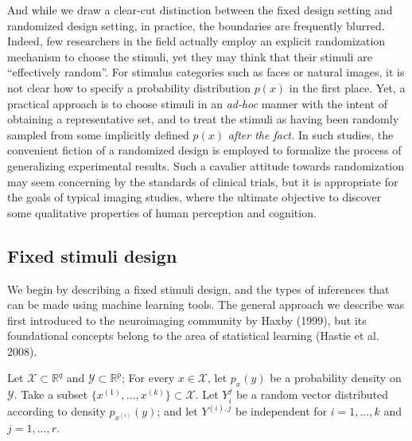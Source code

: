 \documentclass[12pt]{article}
\begin{document}
And while we draw a clear-cut distinction between the fixed design
setting and randomized design setting, in practice, the boundaries are
frequently blurred.  Indeed, few researchers in the field actually
employ an explicit randomization mechanism to choose the stimuli, yet
they may think that their stimuli are ``effectively random''.  For
stimulus categories such as faces or natural images, it is not clear
how to specify a probability distribution $p(x)$ in the first place.
Yet, a practical approach is to choose stimuli in an \emph{ad-hoc}
manner with the intent of obtaining a representative set, and to treat
the stimuli as having been randomly sampled from some implicitly
defined $p(x)$ \emph{after the fact.}  In such studies, the convenient
fiction of a randomized design is employed to formalize the process of
generalizing experimental results.  Such a cavalier attitude towards
randomization may seem concerning by the standards of clinical trials,
but it is appropriate for the goals of typical imaging studies, where
the ultimate objective to discover some qualitative properties of
human perception and cognition.

\subsection{Fixed stimuli design}


We begin by describing a fixed stimuli design, and the types of
inferences that can be made using machine learning tools.  The general
approach we describe was first introduced to the neuroimaging
community by Haxby (1999), but its foundational concepts belong to the
area of statistical learning (Hastie et al. 2008).

Let
$\mathcal{X} \subset \mathbb{R}^q$ and
$\mathcal{Y} \subset \mathbb{R}^p$; 
For every $x \in \mathcal{X}$, let $p_x(y)$
be a probability density on $\mathcal{Y}$.  
Take a subset $\{x^{(1)},\hdots, x^{(k)}\} \subset \mathcal{X}$.  Let
$Y_i^j$ be a random vector distributed according to density
$p_{x^{(i)}}(y)$; and let $Y^{(i),j}$ be independent for $i =
1,\hdots, k$ and $j = 1, \hdots, r.$
 
\end{document}
